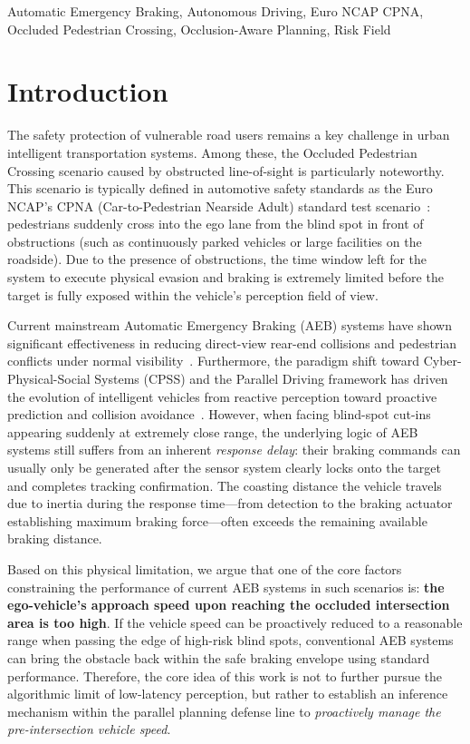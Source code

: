 \documentclass[letterpaper, 10 pt, conference]{ieeeconf}  %
\begin{document}
\begin{keywords}
Automatic Emergency Braking, Autonomous Driving, Euro NCAP CPNA, Occluded Pedestrian Crossing, Occlusion-Aware Planning, Risk Field
\end{keywords}

\section{Introduction}

The safety protection of vulnerable road users remains a key challenge in urban intelligent transportation systems. Among these, the Occluded Pedestrian Crossing scenario caused by obstructed line-of-sight is particularly noteworthy. This scenario is typically defined in automotive safety standards as the Euro NCAP's CPNA (Car-to-Pedestrian Nearside Adult) standard test scenario~\cite{euroncap2023}: pedestrians suddenly cross into the ego lane from the blind spot in front of obstructions (such as continuously parked vehicles or large facilities on the roadside). Due to the presence of obstructions, the time window left for the system to execute physical evasion and braking is extremely limited before the target is fully exposed within the vehicle's perception field of view.

Current mainstream Automatic Emergency Braking (AEB) systems have shown significant effectiveness in reducing direct-view rear-end collisions and pedestrian conflicts under normal visibility~\cite{cicchino2022effects}. Furthermore, the paradigm shift toward Cyber-Physical-Social Systems (CPSS) and the Parallel Driving framework has driven the evolution of intelligent vehicles from reactive perception toward proactive prediction and collision avoidance~\cite{wang2024parallel, wang2021review}. However, when facing blind-spot cut-ins appearing suddenly at extremely close range, the underlying logic of AEB systems still suffers from an inherent \emph{response delay}: their braking commands can usually only be generated after the sensor system clearly locks onto the target and completes tracking confirmation. The coasting distance the vehicle travels due to inertia during the response time---from detection to the braking actuator establishing maximum braking force---often exceeds the remaining available braking distance.

Based on this physical limitation, we argue that one of the core factors constraining the performance of current AEB systems in such scenarios is: \textbf{the ego-vehicle's approach speed upon reaching the occluded intersection area is too high}. If the vehicle speed can be proactively reduced to a reasonable range when passing the edge of high-risk blind spots, conventional AEB systems can bring the obstacle back within the safe braking envelope using standard performance. Therefore, the core idea of this work is not to further pursue the algorithmic limit of low-latency perception, but rather to establish an inference mechanism within the parallel planning defense line to \emph{proactively manage the pre-intersection vehicle speed}.
\end{document}
